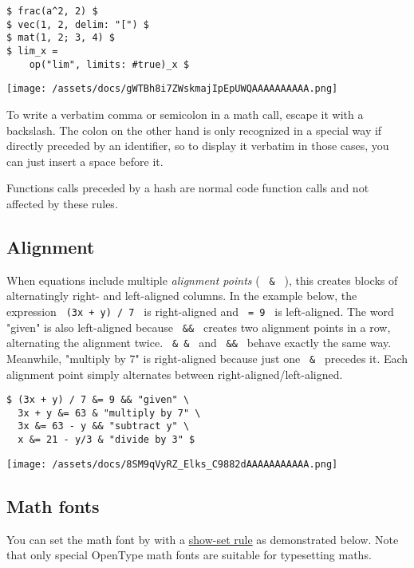 \begin{verbatim}
$ frac(a^2, 2) $
$ vec(1, 2, delim: "[") $
$ mat(1, 2; 3, 4) $
$ lim_x =
    op("lim", limits: #true)_x $
\end{verbatim}

\texttt{[image: /assets/docs/gWTBh8i7ZWskmajIpEpUWQAAAAAAAAAA.png]}

To write a verbatim comma or semicolon in a math call, escape it with a
backslash. The colon on the other hand is only recognized in a special
way if directly preceded by an identifier, so to display it verbatim in
those cases, you can just insert a space before it.

Functions calls preceded by a hash are normal code function calls and
not affected by these rules.

\subsection{Alignment}\label{alignment}

When equations include multiple \emph{alignment points} (
\texttt{\ \&\ } ), this creates blocks of alternatingly right- and
left-aligned columns. In the example below, the expression
\texttt{\ (3x\ +\ y)\ /\ 7\ } is right-aligned and \texttt{\ =\ 9\ } is
left-aligned. The word "given" is also left-aligned because
\texttt{\ \&\&\ } creates two alignment points in a row, alternating the
alignment twice. \texttt{\ \&\ \&\ } and \texttt{\ \&\&\ } behave
exactly the same way. Meanwhile, "multiply by 7" is right-aligned
because just one \texttt{\ \&\ } precedes it. Each alignment point
simply alternates between right-aligned/left-aligned.

\begin{verbatim}
$ (3x + y) / 7 &= 9 && "given" \
  3x + y &= 63 & "multiply by 7" \
  3x &= 63 - y && "subtract y" \
  x &= 21 - y/3 & "divide by 3" $
\end{verbatim}

\texttt{[image: /assets/docs/8SM9qVyRZ\_Elks\_C9882dAAAAAAAAAAA.png]}

\subsection{Math fonts}\label{math-fonts}

You can set the math font by with a
\href{/docs/reference/styling/\#show-rules}{show-set rule} as
demonstrated below. Note that only special OpenType math fonts are
suitable for typesetting maths.

